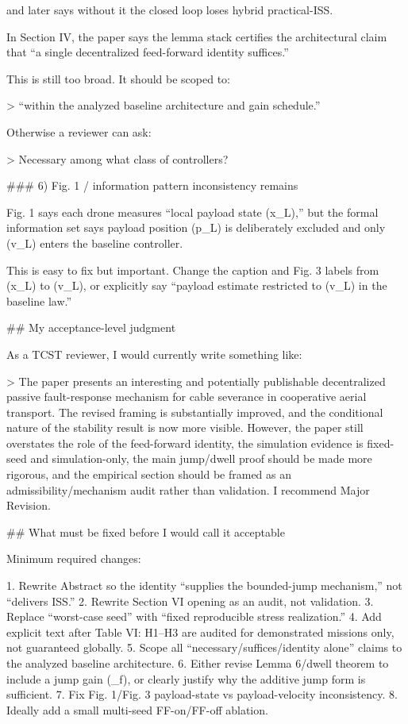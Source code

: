 and later says without it the closed loop loses hybrid practical-ISS.

In Section IV, the paper says the lemma stack certifies the architectural claim that “a single decentralized feed-forward identity suffices.”

This is still too broad. It should be scoped to:

> “within the analyzed baseline architecture and gain schedule.”

Otherwise a reviewer can ask:

> Necessary among what class of controllers?

### 6) Fig. 1 / information pattern inconsistency remains

Fig. 1 says each drone measures “local payload state (x_L),” but the formal information set says payload position (p_L) is deliberately excluded and only (v_L) enters the baseline controller.

This is easy to fix but important. Change the caption and Fig. 3 labels from (x_L) to (v_L), or explicitly say “payload estimate restricted to (v_L) in the baseline law.”

## My acceptance-level judgment

As a TCST reviewer, I would currently write something like:

> The paper presents an interesting and potentially publishable decentralized passive fault-response mechanism for cable severance in cooperative aerial transport. The revised framing is substantially improved, and the conditional nature of the stability result is now more visible. However, the paper still overstates the role of the feed-forward identity, the simulation evidence is fixed-seed and simulation-only, the main jump/dwell proof should be made more rigorous, and the empirical section should be framed as an admissibility/mechanism audit rather than validation. I recommend Major Revision.

## What must be fixed before I would call it acceptable

Minimum required changes:

1. Rewrite Abstract so the identity “supplies the bounded-jump mechanism,” not “delivers ISS.”
2. Rewrite Section VI opening as an audit, not validation.
3. Replace “worst-case seed” with “fixed reproducible stress realization.”
4. Add explicit text after Table VI: H1–H3 are audited for demonstrated missions only, not guaranteed globally.
5. Scope all “necessary/suffices/identity alone” claims to the analyzed baseline architecture.
6. Either revise Lemma 6/dwell theorem to include a jump gain (\mu_f), or clearly justify why the additive jump form is sufficient.
7. Fix Fig. 1/Fig. 3 payload-state vs payload-velocity inconsistency.
8. Ideally add a small multi-seed FF-on/FF-off ablation.

